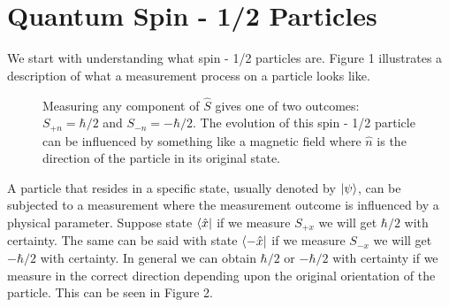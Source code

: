 \documentclass[twocolumn]{article}
\begin{document}
\section*{Quantum Spin - 1/2 Particles}
We start with understanding what spin - 1/2 particles are. Figure 1 illustrates a description of what a measurement process on a particle looks like.
\begin{figure}[ht]
    \centering
    \newcommand{\figonecircrad}{0.25}
    \newcommand{\figonelineaxstart}{2*\figonecircrad}
    \newcommand{\figonelineaxend}{\figonelineaxstart + 1.25}
    \newcommand{\figonerectheight}{5*\figonecircrad}
    \newcommand{\figonerectwidth}{2.5}
    \newcommand{\figonerectx}{\figonelineaxend}
    \newcommand{\figonerecty}{-0.5*\figonerectheight}
    \newcommand{\figonelinebstartx}{\figonerectx + \figonerectwidth}
    \newcommand{\figonelinebendx}{\figonerectx + \figonerectwidth + 1.25}
    \newcommand{\figonelinecstartx}{\figonerectx + \figonerectwidth}
    \newcommand{\figonelinecendx}{\figonerectx + \figonerectwidth + 1.25}
    \caption{\footnotesize{Measuring any component of $\hat{S}$ gives one of two outcomes: $S_{+n}=\hbar/2$ and $S_{-n}=-\hbar/2$. The evolution of this spin - 1/2 particle can be influenced by something like a magnetic field where $\hat{n}$ is the direction of the particle in its original state.}}
    \label{Fig: SWMF}
\end{figure}
\par \noindent
A particle that resides in a specific state, usually denoted by $\ket{\psi}$, can be subjected to a measurement where the measurement outcome is influenced by a physical parameter. Suppose state $\bra{\hat{x}}$ if we measure $S_{+x}$ we will get $\hbar/2$ with certainty. The same can be said with state $\bra{-\hat{x}}$ if we measure $S_{-x}$ we will get $-\hbar/2$ with   certainty. In general we can obtain $\hbar/2$ or $-\hbar/2$ with certainty if we measure in the correct direction depending upon the original orientation of the particle. This can be seen in Figure 2.
\end{document}
